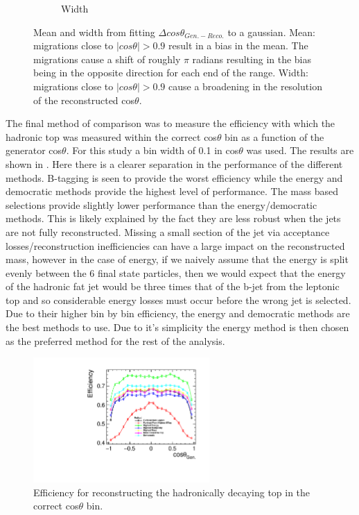 \begin{figure}
\begin{subfigure}{.5\textwidth}
    \caption[Width]{Width}
  \end{subfigure}
  \caption[Mean and width from fitting $\Delta cos\theta_{Gen.-Reco.}$ to a gaussian]{Mean and width from fitting $\Delta cos\theta_{Gen.-Reco.}$ to a gaussian. Mean: migrations close to $\mid cos\theta\mid>0.9$ result in a bias in the mean. The migrations cause a shift of roughly $\pi$ radians resulting in the bias being in the opposite direction for each end of the range. Width: migrations close to $\mid cos\theta\mid>0.9$ cause a broadening in the resolution of the reconstructed cos$\theta$.}
  \label{fig:angleFitDiff}
\end{figure}

The final method of comparison was to measure the efficiency with which the hadronic top was measured within the correct cos$\theta$ bin as a function of the generator cos$\theta$. For this study a bin width of 0.1 in cos$\theta$ was used. The results are shown in . Here there is a clearer separation in the performance of the different methods. B-tagging is seen to provide the worst efficiency while the energy and democratic methods provide the highest level of performance. The mass based selections provide slightly lower performance than the energy/democratic methods. This is likely explained by the fact they are less robust when the jets are not fully reconstructed. Missing a small section of the jet via acceptance losses/reconstruction inefficiencies can have a large impact on the reconstructed mass, however in the case of energy, if we naively assume that the energy is split evenly between the 6 final state particles, then we would expect that the energy of the hadronic fat jet would be three times that of the b-jet from the leptonic top and so considerable energy losses must occur before the wrong jet is selected. Due to their higher bin by bin efficiency, the energy and democratic methods are the best methods to use. Due to it's simplicity the energy method is then chosen as the preferred method for the rest of the analysis. 

\begin{figure}
  \centering
  \includegraphics[width=0.6\textwidth]{TopAnalysis/figures/EfficiencyvsMCTheta.pdf}
  \caption[Efficiency for reconstructing the hadronically decaying top in the correct cos$\theta$ bin]{Efficiency for reconstructing the hadronically decaying top in the correct cos$\theta$ bin.}
  \label{fig:angularEfficiency}
\end{figure}

